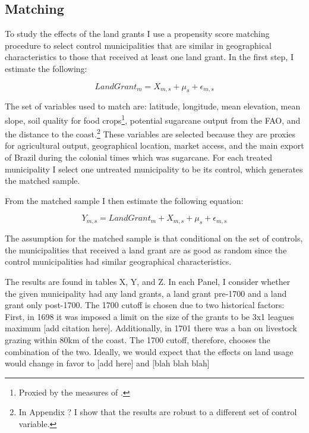 \documentclass{article}
\begin{document}

\subsection{Matching}

To study the effects of the land grants I use a propensity score matching procedure to select control municipalities that are similar in geographical characteristics to those that received at least one land grant. In the first step, I estimate the following:

\begin{equation}
  LandGrant_m = X_{m,s} + \mu_s + \epsilon_{m,s}
\end{equation}

The set of variables used to match are: latitude, longitude, mean elevation, mean slope, soil quality for food crops\footnote{Proxied by the measures of \textcite{Galor2016-ba}.}, potential sugarcane output from the FAO, and the distance to the coast.\footnote{In Appendix ? I show that the results are robust to a different set of control variable.} These variables are selected because they are proxies for agricultural output, geographical location, market access, and the main export of Brazil during the colonial times which was sugarcane. For each treated municipality I select one untreated municipality to be its control, which generates the matched sample.

From the matched sample I then estimate the following equation:

\begin{equation}
  Y_{m,s} = LandGrant_m + X_{m,s} + \mu_s + \epsilon_{m,s}
\end{equation}

The assumption for the matched sample is that conditional on the set of controls, the municipalities that received a land grant are as good as random since the control municipalities had similar geographical characteristics. 

The results are found in tables X, Y, and Z. In each Panel, I consider whether the given municipality had any land grants, a land grant pre-1700 and a land grant only post-1700. The 1700 cutoff is chosen due to two historical factors: First, in 1698 it was imposed a limit on the size of the grants to be 3x1 leagues maximum [add citation here]. Additionally, in 1701 there was a ban on livestock grazing within 80km of the coast. The 1700 cutoff, therefore, chooses the combination of the two. Ideally, we would expect that the effects on land usage would change in favor to [add here] and [blah blah blah] 
\end{document}
